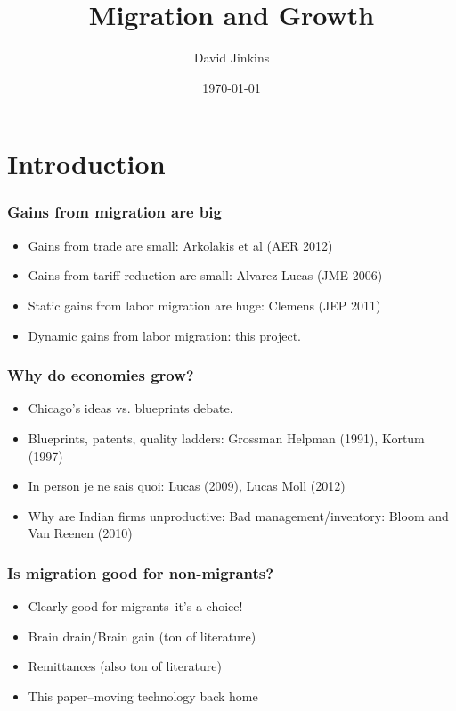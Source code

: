 \documentclass{beamer}
\title{Migration and Growth}
\author{David Jinkins}
\institute
{
    Pennsylvania State University\\
    \medskip
    {\emph{david.jinkins@gmail.com}}
}
\date{\today}
\begin{document}
\begin{frame}
    \maketitle
\end{frame}

\section{Introduction}
\begin{frame}
    \frametitle{Gains from migration are big}
    \begin{itemize}
        \item Gains from trade are small: Arkolakis et al (AER 2012)
        \item Gains from tariff reduction are small: Alvarez Lucas (JME 2006)
        \item Static gains from labor migration are huge: Clemens (JEP 2011)
        \item Dynamic gains from labor migration: this project.
    \end {itemize}
\end{frame}

\begin{frame}
    \frametitle{Why do economies grow?}
    \begin{itemize}
        \item Chicago's ideas vs. blueprints debate.
        \item Blueprints, patents, quality ladders: Grossman Helpman (1991), Kortum (1997)
        \item In person je ne sais quoi: Lucas (2009), Lucas Moll (2012)
        \item Why are Indian firms unproductive: Bad management/inventory: Bloom and Van Reenen (2010)
    \end {itemize}
\end{frame}

\begin{frame}
    \frametitle{Is migration good for non-migrants?}
        \begin{itemize}
            \item Clearly good for migrants--it's a choice!
            \item Brain drain/Brain gain (ton of literature)
            \item Remittances (also ton of literature)
            \item This paper--moving technology back home
        \end{itemize}
\end{frame}
\end{document}

